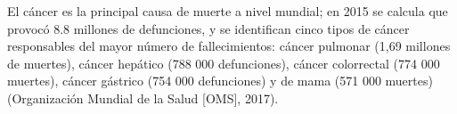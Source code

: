 \documentclass[]{article}
\begin{document}
El cáncer es la principal causa de muerte a nivel mundial; en 2015 se calcula que provocó 8.8
millones de defunciones, y se identifican cinco tipos de cáncer responsables del mayor número de
fallecimientos: cáncer pulmonar (1,69 millones de muertes), cáncer hepático (788 000 defunciones),
cáncer colorrectal (774 000 muertes), cáncer gástrico (754 000 defunciones) y de mama (571 000
muertes) (Organización Mundial de la Salud [OMS], 2017).\citep{InstitutoNacionalDeEstadisticayGeografia2018}\\




\end{document}

